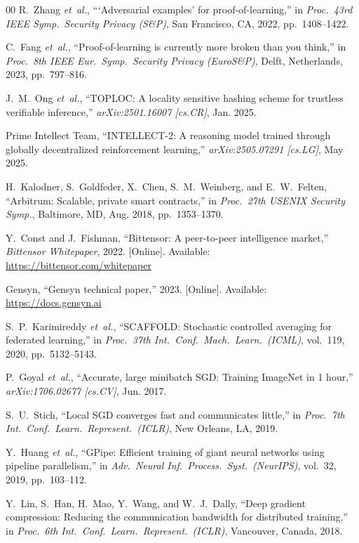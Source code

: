 \documentclass[conference]{IEEEtran}
\begin{document}
\begin{thebibliography}{00}
R.~Zhang \emph{et~al.}, ```Adversarial examples' for proof-of-learning,'' in \emph{Proc.\ 43rd IEEE Symp.\ Security Privacy (S\&P)}, San Francisco, CA, 2022, pp.~1408--1422.

C.~Fang \emph{et~al.}, ``Proof-of-learning is currently more broken than you think,'' in \emph{Proc.\ 8th IEEE Eur.\ Symp.\ Security Privacy (EuroS\&P)}, Delft, Netherlands, 2023, pp.~797--816.

J.~M.~Ong \emph{et~al.}, ``TOPLOC: A locality sensitive hashing scheme for trustless verifiable inference,'' \emph{arXiv:2501.16007 [cs.CR]}, Jan. 2025.

Prime Intellect Team, ``INTELLECT-2: A reasoning model trained through globally decentralized reinforcement learning,'' \emph{arXiv:2505.07291 [cs.LG]}, May 2025.

H.~Kalodner, S.~Goldfeder, X.~Chen, S.~M.~Weinberg, and E.~W.~Felten, ``Arbitrum: Scalable, private smart contracts,'' in \emph{Proc.\ 27th USENIX Security Symp.}, Baltimore, MD, Aug. 2018, pp.~1353--1370.

Y.~Const and J.~Fishman, ``Bittensor: A peer-to-peer intelligence market,'' \emph{Bittensor Whitepaper}, 2022. [Online]. Available: \url{https://bittensor.com/whitepaper}

Gensyn, ``Gensyn technical paper,'' 2023. [Online]. Available: \url{https://docs.gensyn.ai}

S.~P.~Karimireddy \emph{et~al.}, ``SCAFFOLD: Stochastic controlled averaging for federated learning,'' in \emph{Proc.\ 37th Int.\ Conf.\ Mach.\ Learn.\ (ICML)}, vol.~119, 2020, pp.~5132--5143.

P.~Goyal \emph{et~al.}, ``Accurate, large minibatch SGD: Training ImageNet in 1 hour,'' \emph{arXiv:1706.02677 [cs.CV]}, Jun. 2017.

S.~U.~Stich, ``Local SGD converges fast and communicates little,'' in \emph{Proc.\ 7th Int.\ Conf.\ Learn.\ Represent.\ (ICLR)}, New Orleans, LA, 2019.

Y.~Huang \emph{et~al.}, ``GPipe: Efficient training of giant neural networks using pipeline parallelism,'' in \emph{Adv.\ Neural Inf.\ Process.\ Syst.\ (NeurIPS)}, vol.~32, 2019, pp.~103--112.

Y.~Lin, S.~Han, H.~Mao, Y.~Wang, and W.~J.~Dally, ``Deep gradient compression: Reducing the communication bandwidth for distributed training,'' in \emph{Proc.\ 6th Int.\ Conf.\ Learn.\ Represent.\ (ICLR)}, Vancouver, Canada, 2018.


\end{thebibliography}
\end{document}
